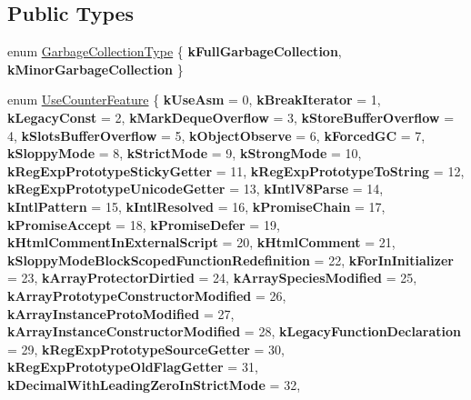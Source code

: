\subsection*{Public Types}
\begin{DoxyCompactItemize}
\item 
enum \mbox{\hyperlink{classv8_1_1Isolate_a5ae00cc99d8aca148c6f5f9698c432c9}{Garbage\+Collection\+Type}} \{ {\bfseries k\+Full\+Garbage\+Collection}, 
{\bfseries k\+Minor\+Garbage\+Collection}
 \}
\item 
enum \mbox{\hyperlink{classv8_1_1Isolate_aed6909379c3f2820cb3084710b73385d}{Use\+Counter\+Feature}} \{ \newline
{\bfseries k\+Use\+Asm} = 0, 
{\bfseries k\+Break\+Iterator} = 1, 
{\bfseries k\+Legacy\+Const} = 2, 
{\bfseries k\+Mark\+Deque\+Overflow} = 3, 
\newline
{\bfseries k\+Store\+Buffer\+Overflow} = 4, 
{\bfseries k\+Slots\+Buffer\+Overflow} = 5, 
{\bfseries k\+Object\+Observe} = 6, 
{\bfseries k\+Forced\+GC} = 7, 
\newline
{\bfseries k\+Sloppy\+Mode} = 8, 
{\bfseries k\+Strict\+Mode} = 9, 
{\bfseries k\+Strong\+Mode} = 10, 
{\bfseries k\+Reg\+Exp\+Prototype\+Sticky\+Getter} = 11, 
\newline
{\bfseries k\+Reg\+Exp\+Prototype\+To\+String} = 12, 
{\bfseries k\+Reg\+Exp\+Prototype\+Unicode\+Getter} = 13, 
{\bfseries k\+Intl\+V8\+Parse} = 14, 
{\bfseries k\+Intl\+Pattern} = 15, 
\newline
{\bfseries k\+Intl\+Resolved} = 16, 
{\bfseries k\+Promise\+Chain} = 17, 
{\bfseries k\+Promise\+Accept} = 18, 
{\bfseries k\+Promise\+Defer} = 19, 
\newline
{\bfseries k\+Html\+Comment\+In\+External\+Script} = 20, 
{\bfseries k\+Html\+Comment} = 21, 
{\bfseries k\+Sloppy\+Mode\+Block\+Scoped\+Function\+Redefinition} = 22, 
{\bfseries k\+For\+In\+Initializer} = 23, 
\newline
{\bfseries k\+Array\+Protector\+Dirtied} = 24, 
{\bfseries k\+Array\+Species\+Modified} = 25, 
{\bfseries k\+Array\+Prototype\+Constructor\+Modified} = 26, 
{\bfseries k\+Array\+Instance\+Proto\+Modified} = 27, 
\newline
{\bfseries k\+Array\+Instance\+Constructor\+Modified} = 28, 
{\bfseries k\+Legacy\+Function\+Declaration} = 29, 
{\bfseries k\+Reg\+Exp\+Prototype\+Source\+Getter} = 30, 
{\bfseries k\+Reg\+Exp\+Prototype\+Old\+Flag\+Getter} = 31, 
\newline
{\bfseries k\+Decimal\+With\+Leading\+Zero\+In\+Strict\+Mode} = 32, 

\end{DoxyCompactItemize}
